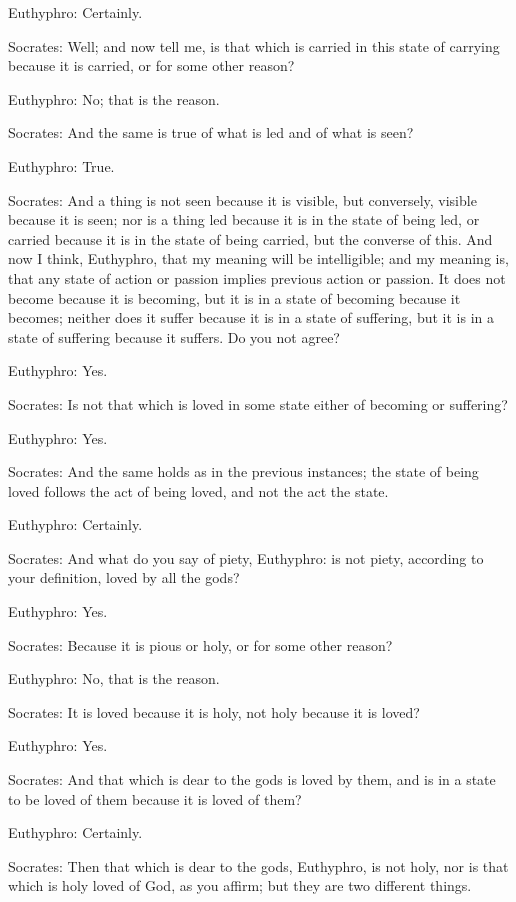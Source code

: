 Euthyphro: Certainly.

Socrates: Well; and now tell me, is that which is carried in this state of carrying because it is carried, or for some other reason?

Euthyphro: No; that is the reason.

Socrates: And the same is true of what is led and of what is seen?

Euthyphro: True.

Socrates: And a thing is not seen because it is visible, but conversely, visible because it is seen; nor is a thing led because it is in the state of being led, or carried because it is in the state of being carried, but the converse of this. And now I think, Euthyphro, that my meaning will be intelligible; and my meaning is, that any state of action or passion implies previous action or passion. It does not become because it is becoming, but it is in a state of becoming because it becomes; neither does it suffer because it is in a state of suffering, but it is in a state of suffering because it suffers. Do you not agree?

Euthyphro: Yes.

Socrates: Is not that which is loved in some state either of becoming or suffering?

Euthyphro: Yes.

Socrates: And the same holds as in the previous instances; the state of being loved follows the act of being loved, and not the act the state.

Euthyphro: Certainly.

Socrates: And what do you say of piety, Euthyphro: is not piety, according to your definition, loved by all the gods?

Euthyphro: Yes.

Socrates: Because it is pious or holy, or for some other reason?

Euthyphro: No, that is the reason.

Socrates: It is loved because it is holy, not holy because it is loved?

Euthyphro: Yes.

Socrates: And that which is dear to the gods is loved by them, and is in a state to be loved of them because it is loved of them?

Euthyphro: Certainly.

Socrates: Then that which is dear to the gods, Euthyphro, is not holy, nor is that which is holy loved of God, as you affirm; but they are two different things.

